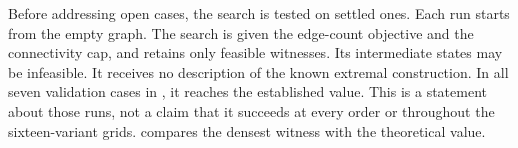 Before addressing open cases, the search is tested on settled ones.
Each run starts from the empty graph.
The search is given the edge-count objective and the connectivity cap, and retains only feasible witnesses. Its intermediate states may be infeasible.
It receives no description of the known extremal construction.
In all seven validation cases in , it reaches the established value. This is a statement about those runs, not a claim that it succeeds at every order or throughout the sixteen-variant grids.
 compares the densest witness with the theoretical value.

\begin{table}[ht]
    \centering
    \small
    
    \caption{Seven short validation runs. Each uses unaided tabu search, initial seed zero and a two-second stopping target per case. Elapsed times include the search and may slightly exceed the target because deadline checks are cooperative. The search count and known optimum are separate columns. These are not the one-hour allocations of .}
    \label{tab:rediscovery}
\end{table}

